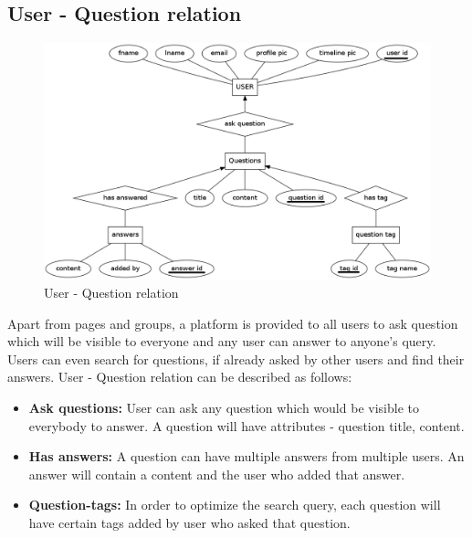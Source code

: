 \documentclass{article}
\begin{document}
\subsection{User - Question relation}
\begin{figure}[h!]
\centering
\includegraphics[scale=0.4]{user_question.png}
\caption{User - Question relation}
\label{fig4}
\end{figure}
Apart from pages and groups, a platform is provided to all users to ask question which will be visible to everyone and any user can answer to anyone's query. Users can even search for questions, if already asked by other users and find their answers. User - Question relation can be described as follows:
\begin{itemize}
\item \textbf{Ask questions:} User can ask any question which would be visible to everybody to answer. A question will have attributes - question title, content.
\item \textbf{Has answers:} A question can have multiple answers from multiple users. An answer will contain a content and the user who added that answer.
\item \textbf{Question-tags:} In order to optimize the search query, each question will have certain tags added by user who asked that question. 
\end{itemize} 
\end{document}
